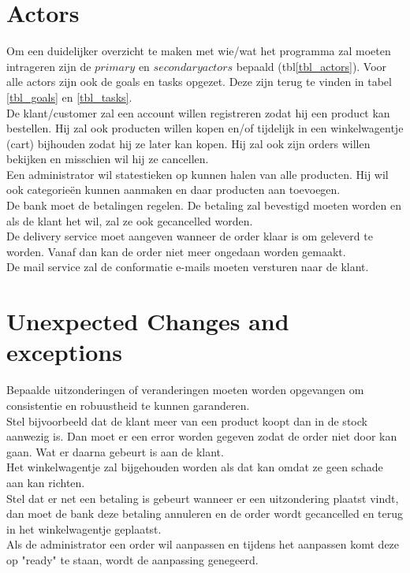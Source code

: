 \documentclass[•]{article}
\begin{document}
\section{Actors}
Om een duidelijker overzicht te maken met wie/wat het programma zal moeten intrageren zijn de $primary$ en $secondary actors$ bepaald (tbl\ref{tbl_actors}). Voor alle actors zijn ook de goals en tasks opgezet. Deze zijn terug te vinden in tabel \ref{tbl_goals} en \ref{tbl_tasks}. \\
De klant/customer zal een account willen registreren zodat hij een product kan bestellen. Hij zal ook producten willen kopen en/of tijdelijk in een winkelwagentje (cart) bijhouden zodat hij ze later kan kopen. Hij zal ook zijn orders willen bekijken en misschien wil hij ze cancellen.\\
Een administrator wil statestieken op kunnen halen van alle producten. Hij wil ook categorie\"en kunnen aanmaken en daar producten aan toevoegen.\\
De bank moet de betalingen regelen. De betaling zal bevestigd moeten worden en als de klant het wil, zal ze ook gecancelled worden.\\
De delivery service moet aangeven wanneer de order klaar is om geleverd te worden. Vanaf dan kan de order niet meer ongedaan worden gemaakt.\\
De mail service zal de conformatie e-mails moeten versturen naar de klant.\\

\section{Unexpected Changes and exceptions}
Bepaalde uitzonderingen of veranderingen moeten worden opgevangen om consistentie en robuustheid te kunnen garanderen.\\
Stel bijvoorbeeld dat de klant meer van een product koopt dan in de stock aanwezig is. Dan moet er een error worden gegeven zodat de order niet door kan gaan. Wat er daarna gebeurt is aan de klant.\\
Het winkelwagentje zal bijgehouden worden als dat kan omdat ze geen schade aan kan richten.\\
Stel dat er net een betaling is gebeurt wanneer er een uitzondering plaatst vindt, dan moet de bank deze betaling annuleren en de order wordt gecancelled en terug in het winkelwagentje geplaatst.\\
Als de administrator een order wil aanpassen en tijdens het aanpassen komt deze op "ready" te staan, wordt de aanpassing genegeerd.
\end{document}
